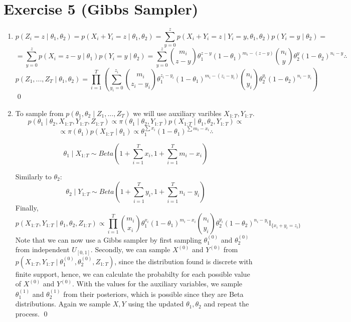 \documentclass[12pt,letterpaper]{article}
\begin{document}
\section*{Exercise 5 (Gibbs Sampler)}
\begin{enumerate}[leftmargin=!,labelindent=5pt]
\item  
$$
p(Z_i = z \mid \theta_1, \theta_2) = p(X_i + Y_i = z \mid
\theta_1,\theta_2) =
\sum_{y = 0}^{z}p(X_i+Y_i = z \mid Y_i = y, \theta_1,\theta_2)
p(Y_i = y \mid \theta_2) =
$$
$$ = 
\sum_{y = 0}^{z}p(X_i = z - y \mid \theta_1 )p(Y_i = y\mid\theta_2) =
\sum_{y = 0}^{z}\binom{m_i}{z-y}
\theta_1^{z - y}(1-\theta_1)^{m_i - (z-y)}
\binom{n_i}{y}
\theta_2^{y}(1-\theta_2)^{n_i - y} \therefore
$$
$$
p(Z_1,...,Z_T \mid \theta_1, \theta_2) = 
\prod_{i=1}^{T}\left ( 
\sum_{y_i = 0}^{z_i}\binom{m_i}{z_i-y_i}
\theta_1^{z_i - y_i}(1-\theta_1)^{m_i - (z_i-y_i)}
\binom{n_i}{y_i}
\theta_2^{y_i}(1-\theta_2)^{n_i - y_i}
\right)
$$
\qed

\item To sample from
$
p(\theta_1,\theta_2 \mid Z_1,...,Z_T)
$
we will use auxiliary varibles $X_{1:T}, Y_{1:T}$. 
$$
p(\theta_1 \mid \theta_2, X_{1:T},Y_{1:T},Z_{1:T}) \propto 
\pi(\theta_1 \mid \theta_2, Y_{1:T})
p(X_{1:T} \mid \theta_1,\theta_2, Y_{1:T}) \propto
$$
$$
\propto 
\pi(\theta_1)p(X_{1:T}\mid \theta_1) \propto
\theta_1^{\sum x_i}(1-\theta_1)^{\sum m_i - x_i} \therefore
$$

$$
\theta_1 \mid X_{1:T} \sim Beta \left(
1 + \sum_{i=1}^T x_i, 1 + \sum_{i=1}^T m_i - x_i
\right)
$$

Similarly to $\theta_2$:
$$
\theta_2 \mid Y_{1:T} \sim Beta \left(
1 + \sum_{i=1}^T y_i, 1 + \sum_{i=1}^T n_i - y_i
\right)
$$
Finally,
$$
p(X_{1:T},Y_{1:T} \mid \theta_1, \theta_2, Z_{1:T}) \propto
\prod_{i=1}^{T}\binom{m_i}{x_i}\theta_1^{x_i}(1-\theta_1)^{m_i - x_i}
\binom{n_i}{y_i}\theta_2^{y_i}(1-\theta_2)^{n_i - y_i}
\mathbb{I}_{\{
x_i + y_i = z_i
\}}
$$
Note that we can now use a Gibbs sampler by first
sampling $\theta_1^{(0)}$
and  $\theta_2^{(0)}$ from independent $U_{[0,1]}$. Secondly, we can sample
$X^{(0)}$ and $Y^{(0)}$ from $p(X_{1:T},Y_{1:T}
\mid \theta_1^{(0)}, \theta_2^{(0)}, Z_{1:T})$,
since the distribution found is discrete with finite 
support, hence, we can calculate the probabilty for each possible value
of $X^{(0)}$ and $Y^{(0)}$.
With the values for the auxiliary variables, we 
sample $\theta_1^{(1)}$ and $\theta_2^{(1)}$ from their posteriors, which is possible
since they are Beta distributions. Again we sample $X,Y$ using the
updated $\theta_1,\theta_2$ and repeat the process.
\qed

\end{enumerate}
\end{document}
